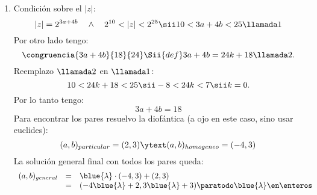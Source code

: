 \begin{enumerate}[label=\alph*)]
  \item
        Condición sobre el $|z|$:
        $$
          |z| = 2^{3a+4b}
          \quad\land\quad
          2^{10} < |z| < 2 ^{25}
          \sii
          10 < 3a+4b < 25 \llamada1
        $$
        Por otro lado tengo:
        $$
          \congruencia{3a + 4b}{18}{24}
          \Sii{def}
          3a + 4b = 24k + 18 \llamada2.
        $$
        Reemplazo $\llamada2$ en $\llamada1$:
        $$
          10 < 24k + 18 < 25
          \sii
          -8 < 24k < 7
          \sii
          k = 0.
        $$
        Por lo tanto tengo:
        $$
          3a + 4b = 18
        $$
        Para encontrar los pares resuelvo la diofántica {\tiny (a ojo en este caso, sino usar euclides)}:
        $$
          (a,b)_{particular} = (2,3) \ytext (a,b)_{homogeneo} = (-4,3)
        $$
        La solución general final con todos los pares queda:
        $$
          \begin{array}{rcl}
            (a,b)_{general} & = & \blue{\lambda}  \cdot (-4,3) +  (2,3)                                             \\
                            & = & (-4\blue{\lambda} + 2, 3\blue{\lambda} + 3) \paratodo \blue{\lambda} \en \enteros
          \end{array}
        $$
\end{enumerate}

\begin{aportes}
  \item {}
  \item {}
\end{aportes}
